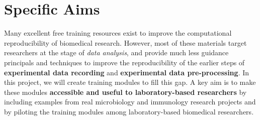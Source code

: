 \documentclass[pdftex,english,11pt,parskip=half]{scrartcl}
\begin{document}
\clearpage

\section*{Specific Aims}
\begingroup
    \fontsize{11pt}{12pt}\selectfont 
    
Many excellent free training resources exist to improve the computational reproducibility of biomedical research. However, most of these materials target researchers at the stage of \textit{data analysis}, and provide much less guidance principals and techniques to improve the reproducibility of the earlier steps of \textbf{experimental data recording} and \textbf{experimental data pre-processing}. In this project, we will create training modules to fill this gap. A key aim is to make these modules \textbf{accessible and useful to laboratory-based researchers} by including examples from real microbiology and immunology research projects and by piloting the training modules among laboratory-based biomedical researchers.

\end{document}
